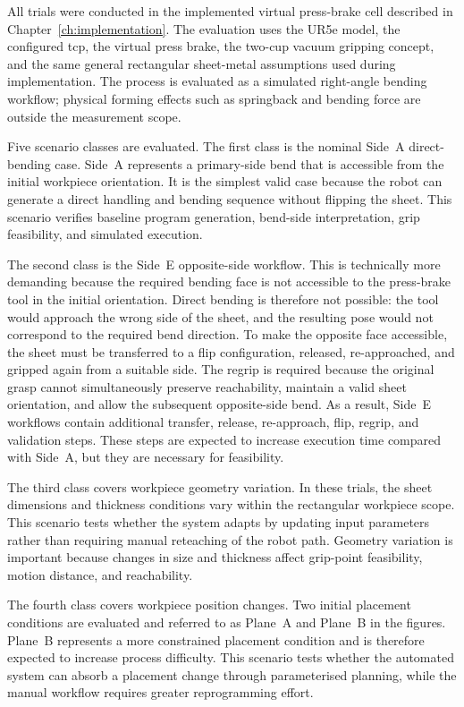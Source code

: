 All trials were conducted in the implemented virtual press-brake cell described in Chapter~\ref{ch:implementation}. The evaluation uses the UR5e model, the configured \ac{tcp}, the virtual press brake, the two-cup vacuum gripping concept, and the same general rectangular sheet-metal assumptions used during implementation. The process is evaluated as a simulated right-angle bending workflow; physical forming effects such as springback and bending force are outside the measurement scope.

Five scenario classes are evaluated. The first class is the nominal Side~A direct-bending case. Side~A represents a primary-side bend that is accessible from the initial workpiece orientation. It is the simplest valid case because the robot can generate a direct handling and bending sequence without flipping the sheet. This scenario verifies baseline program generation, bend-side interpretation, grip feasibility, and simulated execution.

The second class is the Side~E opposite-side workflow. This is technically more demanding because the required bending face is not accessible to the press-brake tool in the initial orientation. Direct bending is therefore not possible: the tool would approach the wrong side of the sheet, and the resulting pose would not correspond to the required bend direction. To make the opposite face accessible, the sheet must be transferred to a flip configuration, released, re-approached, and gripped again from a suitable side. The regrip is required because the original grasp cannot simultaneously preserve reachability, maintain a valid sheet orientation, and allow the subsequent opposite-side bend. As a result, Side~E workflows contain additional transfer, release, re-approach, flip, regrip, and validation steps. These steps are expected to increase execution time compared with Side~A, but they are necessary for feasibility.

The third class covers workpiece geometry variation. In these trials, the sheet dimensions and thickness conditions vary within the rectangular workpiece scope. This scenario tests whether the system adapts by updating input parameters rather than requiring manual reteaching of the robot path. Geometry variation is important because changes in size and thickness affect grip-point feasibility, motion distance, and reachability.

The fourth class covers workpiece position changes. Two initial placement conditions are evaluated and referred to as Plane~A and Plane~B in the figures. Plane~B represents a more constrained placement condition and is therefore expected to increase process difficulty. This scenario tests whether the automated system can absorb a placement change through parameterised planning, while the manual workflow requires greater reprogramming effort.

